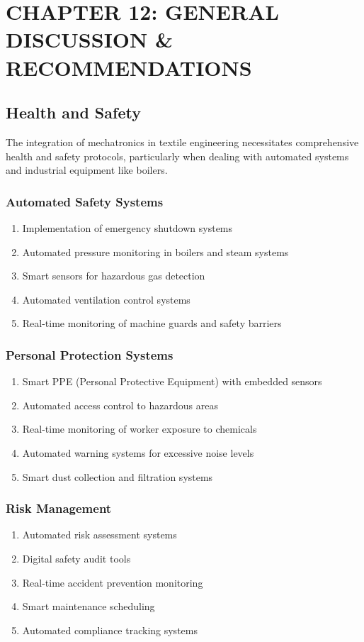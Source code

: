 \section{CHAPTER 12: GENERAL DISCUSSION \& RECOMMENDATIONS}
\subsection{Health and Safety}
The integration of mechatronics in textile engineering necessitates comprehensive health and safety protocols, particularly when dealing with automated systems and industrial equipment like boilers.
\subsubsection{Automated Safety Systems}
\begin{enumerate}
\item Implementation of emergency shutdown systems
\item Automated pressure monitoring in boilers and steam systems
\item Smart sensors for hazardous gas detection
\item Automated ventilation control systems
\item Real-time monitoring of machine guards and safety barriers
\end{enumerate}
\subsubsection{Personal Protection Systems}
\begin{enumerate}
\item Smart PPE (Personal Protective Equipment) with embedded sensors
\item Automated access control to hazardous areas
\item Real-time monitoring of worker exposure to chemicals
\item Automated warning systems for excessive noise levels
\item Smart dust collection and filtration systems
\end{enumerate}
\subsubsection{Risk Management}
\begin{enumerate}
\item Automated risk assessment systems
\item Digital safety audit tools
\item Real-time accident prevention monitoring
\item Smart maintenance scheduling
\item Automated compliance tracking systems
\end{enumerate}
